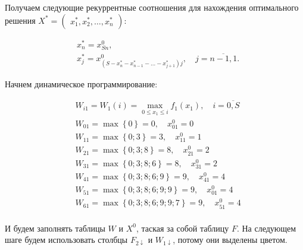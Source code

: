Получаем следующие рекуррентные соотношения для нахождения оптимального решения $X^* = \begin{pmatrix} x_1^*, x_2^*, \dots, x_n^* \end{pmatrix}$:

\begin{align*}
     & x_n^* = x_{Sn}^0,                                                                        \\
     & x_j^* = x_{(S - x_n^* - x_{n-1}^* - \dots - x_{j+1}^*)j}^0, \quad j = \overline{n-1, 1}.
\end{align*}

Начнем динамическое программирование:

\begin{align*}
     & W_{i1} = W_1(i) = \max\limits_{0 \leq x_1 \leq i} f_1(x_1), \quad i = \overline{0, S} \\
     & W_{01} = \max \left\{0\right\} = 0, \quad x_{01}^0 = 0                                \\
     & W_{11} = \max \left\{0; 3\right\} = 3, \quad x_{11}^0 = 1                             \\
     & W_{21} = \max \left\{0; 3; 8\right\} = 8, \quad x_{21}^0 = 2                          \\
     & W_{31} = \max \left\{0; 3; 8; 6\right\} = 8, \quad x_{31}^0 = 2                       \\
     & W_{41} = \max \left\{0; 3; 8; 6; 9\right\} = 9, \quad x_{41}^0 = 4                    \\
     & W_{51} = \max \left\{0; 3; 8; 6; 9; 9\right\} = 9, \quad x_{01}^0 = 4                 \\
     & W_{61} = \max \left\{0; 3; 8; 6; 9; 9; 7\right\} = 9, \quad x_{51}^0 = 4              \\
\end{align*}

И будем заполнять таблицы $W$ и $X^0$, таская за собой таблицу $F$. На следующем шаге будем использовать столбцы $F_{2 \downarrow}$ и $W_{1 \downarrow}$, потому они выделены цветом.

